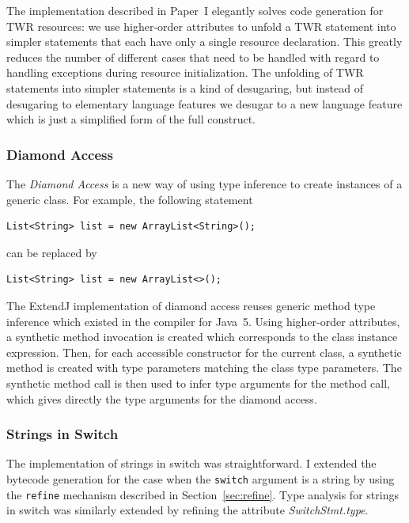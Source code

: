 \documentclass[10pt, twoside, openright]{book}
\newcommand{\secref}[1]{Section~\ref{#1}}
\begin{document}
The implementation described in Paper~I elegantly solves code generation for TWR resources:
we use higher-order attributes to unfold a TWR statement
into simpler statements that each have only a single resource declaration. This greatly reduces the
number of different cases that need to be handled with regard to handling exceptions during
resource initialization. The unfolding of TWR statements into simpler statements is a kind
of desugaring, but instead of desugaring to elementary language features we desugar to
a new language feature which is just a simplified form of the full construct.

\subsubsection{Diamond Access}

The \emph{Diamond Access} is a new way of using type inference to create
instances of a generic class.  For example, the following statement

\begin{lstlisting}
List<String> list = new ArrayList<String>();
\end{lstlisting}

\noindent
can be replaced by


\begin{lstlisting}
List<String> list = new ArrayList<>();
\end{lstlisting}

\noindent
The ExtendJ implementation of diamond access reuses generic method type inference which existed in the
compiler for Java~5. Using higher-order attributes, a synthetic method invocation is created
which corresponds to the class instance expression. Then, for each accessible constructor
for the current class, a synthetic method is created with type parameters matching the
class type parameters. The synthetic method call is then used to infer type arguments
for the method call, which gives directly the type arguments for the diamond access.

\subsubsection{Strings in Switch}

The implementation of strings in switch was straightforward. I extended the
bytecode generation for the case when the \verb'switch' argument is a string by
using the \verb'refine' mechanism described in \secref{sec:refine}.
Type analysis for strings in switch was similarly extended by refining the attribute
\emph{SwitchStmt.type}.
\end{document}
